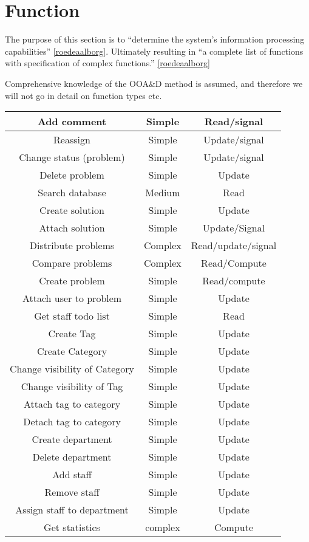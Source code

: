 \section{Function}
The purpose of this section is to ``determine the system's information processing capabilities'' \ref{roedeaalborg}. Ultimately resulting in ``a complete list of functions with specification of complex functions.'' 
\ref{roedeaalborg}

Comprehensive knowledge of the OOA\&D method is assumed, and therefore we will not go in detail on function types etc. 

\begin{table}[h] %

\begin{center}
\begin{tabular}{|c|c|c|}
\hline
Add comment &   Simple & Read/signal   \\ \hline%
Reassign & Simple   & Update/signal \\ \hline%
Change status (problem) &   Simple & Update/signal \\ \hline%
Delete problem & Simple &   Update \\   \hline%
Search database & Medium &   Read \\ \hline%
Create solution & Simple &   Update \\   \hline%
Attach solution & Simple &   Update/Signal \\   \hline%
Distribute problems &   Complex & Read/update/signal \\   \hline%
Compare problems & Complex & Read/Compute \\ \hline%
Create problem &   Simple & Read/compute \\   \hline%
Attach user to problem & Simple & Update \\ \hline%
Get staff todo list & Simple & Read \\   \hline%
Create Tag & Simple &   Update \\ \hline%
Create Category & Simple & Update \\ \hline%
Change visibility of Category &   Simple &   Update \\   \hline%
Change visibility of Tag &   Simple &  Update \\ \hline%
Attach tag to category & Simple & Update \\ \hline%
Detach tag to category & Simple & Update \\ \hline%
Create department & Simple & Update \\ \hline%
Delete department & Simple & Update \\ \hline%
Add staff & Simple & Update \\ \hline%
Remove staff & Simple & Update \\ \hline%
Assign staff to department & Simple & Update \\ \hline%
Get statistics & complex & Compute \\ \hline%


\end{tabular}
\end{center}
\end{table}
